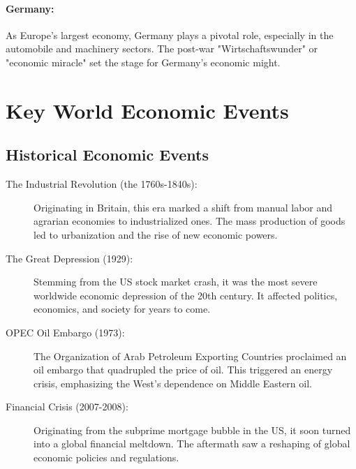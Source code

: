 \paragraph{Germany:}
As Europe's largest economy, Germany plays a pivotal role, especially in the automobile and machinery sectors. The post-war "Wirtschaftswunder" or "economic miracle" set the stage for Germany's economic might.

\section*{Key World Economic Events}

\subsection*{Historical Economic Events}
\begin{description}
    \item[The Industrial Revolution (the 1760s-1840s):] Originating in Britain, this era marked a shift from manual labor and agrarian economies to industrialized ones. The mass production of goods led to urbanization and the rise of new economic powers.
    \item[The Great Depression (1929):] Stemming from the US stock market crash, it was the most severe worldwide economic depression of the 20th century. It affected politics, economics, and society for years to come.
    \item[OPEC Oil Embargo (1973):] The Organization of Arab Petroleum Exporting Countries proclaimed an oil embargo that quadrupled the price of oil. This triggered an energy crisis, emphasizing the West's dependence on Middle Eastern oil.
    \item[Financial Crisis (2007-2008):] Originating from the subprime mortgage bubble in the US, it soon turned into a global financial meltdown. The aftermath saw a reshaping of global economic policies and regulations.
\end{description}

